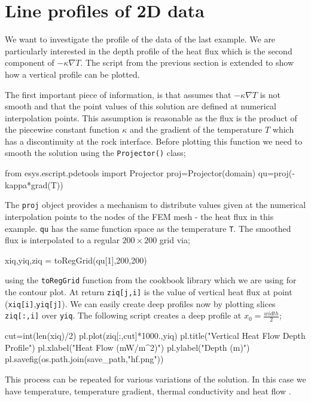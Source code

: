 \section{Line profiles of 2D data}
We want to investigate the profile of the data of the last example. 
We are particularly interested in the depth profile of the heat flux which is
the second component of $-\kappa \nabla T$. The script from the previous section
is extended
to show how a vertical profile can be plotted.

The first important piece of information, is that \esc assumes that $-\kappa
\nabla T$ is not smooth and
that the point values of this solution are defined at numerical interpolation points. This assumption
is reasonable as
the flux is the product of the piecewise constant function $\kappa$ and 
the gradient of the temperature $T$ which has a discontinuity at the rock
interface. 
Before plotting this function we need to smooth the solution using the 
\verb|Projector()| class;
\begin{python}
from esys.escript.pdetools import Projector
proj=Projector(domain)
qu=proj(-kappa*grad(T))
\end{python}
The \verb|proj| object provides a mechanism to distribute values given at the
numerical interpolation points to the nodes
of the FEM mesh - the heat flux in this example. \verb|qu| has the same function
space
as the temperature \verb|T|. The smoothed flux is interpolated 
to a regular $200\times 200$ grid via;
\begin{python}
xiq,yiq,ziq = toRegGrid(qu[1],200,200)
\end{python}
using the \verb|toRegGrid| function from the cookbook library which we are using
for the contour plot.
At return \verb|ziq[j,i]| is the value of vertical heat flux at point 
(\verb|xiq[i]|,\verb|yiq[j]|). We can easily create deep profiles now by
plotting slices \verb|ziq[:,i]| over \verb|yiq|. The following script
creates a deep profile at $x_{0}=\frac{width}{2}$;
\begin{python}
cut=int(len(xiq)/2)
pl.plot(ziq[:,cut]*1000.,yiq)
pl.title("Vertical Heat Flow Depth Profile")
pl.xlabel("Heat Flow (mW/m^2)")
pl.ylabel("Depth (m)")
pl.savefig(os.path.join(save_path,"hf.png"))
\end{python}
This process can be repeated for various variations of the solution. In this
case we have temperature, temperature gradient, thermal conductivity and heat
flow .

